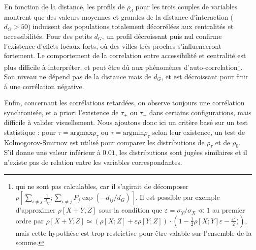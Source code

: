 En fonction de la distance, les profils de $\rho_d$ pour les trois couples de variables montrent que des valeurs moyennes et grandes de la distance d'interaction ($d_G > 50$) induisent des populations totalement décorrélées aux centralités et accessibilités. Pour des petits $d_G$, un profil décroissant puis nul confirme l'existence d'effets locaux forts, où des villes très proches s'influenceront fortement. Le comportement de la correlation entre accessibilité et centralité est plus difficile à interpréter, et peut être dû aux phénomènes d'auto-correlation\footnote{qui ne sont pas calculables, car il s'agirait de décomposer $\rho\left[\sum_{i\neq j} \frac{1}{d_{ij}}; \sum_{i\neq j} P_j \exp{\left(-d_{ij}/d_G\right)}\right]$. Il est possible par exemple d'approximer $\rho\left[X+Y;Z\right]$ sous la condition que $\varepsilon = \sigma_Y / \sigma_X \ll 1$ au premier ordre par $\rho\left[ X+Y;Z \right] \simeq \left(\rho\left[ X;Z \right]  + \varepsilon \rho\left[Y;Z\right]\right)\cdot\left(1 - \frac{1}{2}\rho\left[X;Y\right]\varepsilon - \frac{\varepsilon^2}{2})\right)$, mais cette hypothèse est trop restrictive pour être valable sur l'ensemble de la somme.}. Son niveau ne dépend pas de la distance mais de $d_G$, et est décroissant pour finir à une corrélation négative.



Enfin, concernant les corrélations retardées, on observe toujours une corrélation synchronisée, et a priori l'existence de $\tau_+$ ou $\tau_-$ dans certains configurations, mais difficile à valider visuellement. Nous ajoutons donc ici un critère basé sur un test statistique : pour $\tau = \textrm{argmax} \rho_{\tau}$ ou $\tau = \textrm{argmin} \rho_{\tau}$ selon leur existence, un test de Kolmogorov-Smirnov est utilisé pour comparer les distributions de $\rho_{\tau}$ et de $\rho_0$. S'il donne une valeur inférieur à $0.01$, les distributions sont jugées similaires et il n'existe pas de relation entre les variables correspondantes.

